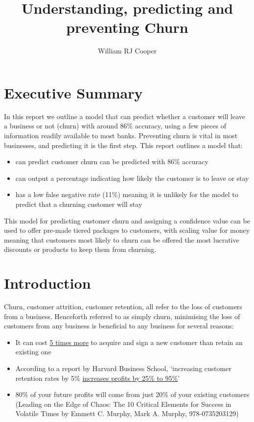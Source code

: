 \documentclass[]{article}
\title{Understanding, predicting and preventing Churn}
\author{William RJ Cooper}
\newcommand{\winningaccuracy}{86\%\xspace}
\newcommand{\winningfnrate}{11\%\xspace}
\begin{document}
\maketitle

\section{Executive Summary}

In this report we outline a model that can predict whether a customer will leave a business or not (churn) with around \winningaccuracy accuracy, using a few pieces of information readily available to most banks. Preventing churn is vital in most businesses, and predicting it is the first step. This report outlines a model that:

\begin{itemize}
	\item can predict customer churn can be predicted with \winningaccuracy accuracy
	\item can output a percentage indicating how likely the customer is to leave or stay
	\item has a low false negative rate (\winningfnrate) meaning it is unlikely for the model to predict that a churning customer will stay
\end{itemize}

This model for predicting customer churn and assigning a confidence value can be used to offer pre-made tiered packages to customers, with scaling value for money meaning that customers most likely to churn can be offered the most lucrative discounts or products to keep them from churning.

\section{Introduction}

Churn, customer attrition, customer retention, all refer to the loss of customers from a business. Henceforth referred to as simply churn, minimising the loss of customers from any business is beneficial to any business for several reasons:

\begin{itemize}
	\item It can cost \href{https://www.forbes.com/sites/jiawertz/2018/09/12/dont-spend-5-times-more-attracting-new-customers-nurture-the-existing-ones/#47efa3d45a8e}{5 times more} to acquire and sign a new customer than retain an existing one
	\item According to a report by Harvard Business School, ‘increasing customer retention rates by 5\% \href{https://hbswk.hbs.edu/archive/the-economics-of-e-loyalty}{increases profits by 25\% to 95\%}’
	\item 80\% of your future profits will come from just 20\% of your existing customers (Leading on the Edge of Chaos: The 10 Critical Elements for Success in Volatile Times by Emmett C. Murphy, Mark A. Murphy, 978-0735203129)
\end{itemize}
\end{document}
